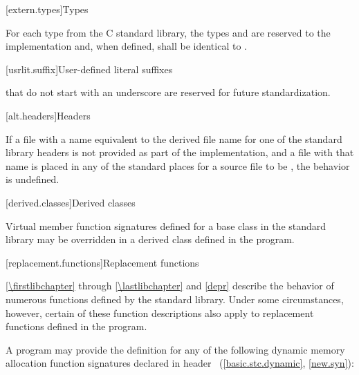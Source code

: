 [extern.types]{Types}

\pnum
For each type  from the C standard library,
the types
and
are reserved to the implementation and, when defined,
shall be identical to
.

[usrlit.suffix]{User-defined literal suffixes}

\pnum
{} that do not start with an underscore are reserved for future standardization.

[alt.headers]{Headers}

\pnum
If a file with a name
equivalent to the derived file name for one of the \Cpp{} standard library headers
is not provided as part of the implementation, and a file with that name
is placed in any of the standard places for a source file to be ,
the behavior is undefined.%
%

[derived.classes]{Derived classes}

\pnum
Virtual member function signatures defined
%
for a base class in the \Cpp{} standard
%
%
library may be overridden in a derived class defined in the program.

[replacement.functions]{Replacement functions}

\pnum
{}%
\ref{\firstlibchapter} through \ref{\lastlibchapter} and \ref{depr}
describe the behavior of numerous functions defined by
the \Cpp{} standard library.
Under some circumstances,
%
however, certain of these function descriptions also apply to replacement functions defined
in the program.

\pnum
A \Cpp{} program may provide the definition for any of the following
dynamic memory allocation function signatures declared in header
~(\ref{basic.stc.dynamic}, \ref{new.syn}):

